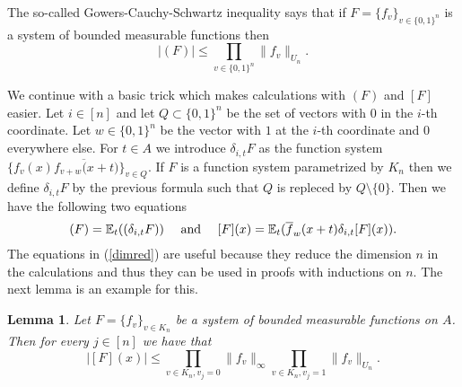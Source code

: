 \documentclass [11pt] {article}
\newtheorem{lemma}{Lemma}[section]
\begin{document}
The so-called Gowers-Cauchy-Schwartz inequality says that if $F=\{f_v\}_{v\in\{0,1\}^n}$ is a system of bounded measurable functions then 
\begin{equation}\label{GCS}
|(F)|\leq\prod_{v\in\{0,1\}^n}\|f_v\|_{U_n}.
\end{equation}

\medskip

We continue with a basic trick which makes calculations with $(F)$ and $[F]$ easier.
Let $i\in [n]$ and let $Q\subset\{0,1\}^n$ be the set of vectors with $0$ in the $i$-th coordinate. Let $w\in\{0,1\}^n$ be the vector with $1$ at the $i$-th coordinate and $0$ everywhere else. For $t\in A$ we introduce $\delta_{i,t} F$ as the function system $\{f_v(x)\overline{f_{v+w}(x+t})\}_{v\in Q}$. If $F$ is a function system parametrized by $K_n$ then we define $\delta_{i,t} F$ by the previous formula such that $Q$ is repleced by $Q\setminus\{0\}$.
Then we have the following two equations 
\begin{equation}\label{dimred}
(F)=\mathbb{E}_t((\delta_{i,t} F))~~~~{\rm and}~~~~[F](x)=\mathbb{E}_t(\overline{f}_w(x+t)\delta_{i,t}[F](x)).
\end{equation}
The equations in (\ref{dimred}) are useful because they reduce the dimension $n$ in the calculations and thus they can be used in proofs with inductions on $n$. The next lemma is an example for this.  

\medskip


\begin{lemma}\label{cornineq} Let $F=\{f_v\}_{v\in K_n}$ be a system of bounded measurable functions on $A$. Then for every $j\in[n]$ we have that
$$|[F](x)|\leq\prod_{v\in K_n,v_j=0}\|f_v\|_\infty\prod_{v\in K_n,v_j=1}\|f_v\|_{U_n}.$$
\end{lemma}
\end{document}
